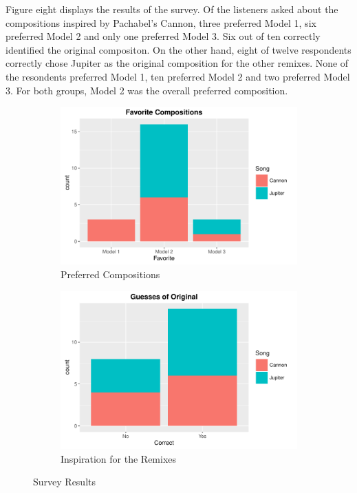 \documentclass{article} %
\begin{document}
Figure eight displays the results of the survey. Of the listeners asked about the compositions inspired by Pachabel's Cannon, three preferred Model 1, six preferred Model 2 and only one preferred Model 3. Six out of ten correctly identified the original compositon. On the other hand, eight of twelve respondents correctly chose Jupiter as the original composition for the other remixes. None of the resondents preferred Model 1, ten preferred Model 2 and two preferred Model 3. For both groups, Model 2 was the overall preferred composition. 




\begin{figure}
\centering
\begin{subfigure}{.5\textwidth}
  \centering
  \includegraphics[scale = 0.5]{SurveyFav.pdf}
  \caption{Preferred Compositions}
  \label{fig:sub1}
\end{subfigure}%
\begin{subfigure}{.5\textwidth}
  \centering
  \includegraphics[scale = 0.5]{SurveyGuesses.pdf}
  \caption{Inspiration for the Remixes}
  \label{fig:sub2}
\end{subfigure}
\caption{Survey Results}
\label{fig:test}
\end{figure}
\end{document}
